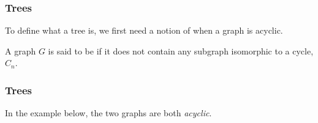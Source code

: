 \documentclass[11pt, mathserif]{beamer}
\theoremstyle{definition}
\theoremstyle{remark}
\begin{document}
\begin{frame}
  \frametitle{Trees}


To define what a tree is, we first need a notion of when a graph is acyclic.

\begin{definition}[Acyclic]
	A graph $G$ is said to be  if it does not contain any subgraph isomorphic to a cycle, $C_n$.
\end{definition}

\end{frame}

\begin{frame}
  \frametitle{Trees}

  
	In the example below, the two graphs are both \emph{acyclic}.
	\begin{center}



		\begin{tikzpicture}[x=0.75pt,y=0.75pt,yscale=-1,xscale=1]
		

\end{tikzpicture}
\end{center}
\end{frame}
\end{document}
